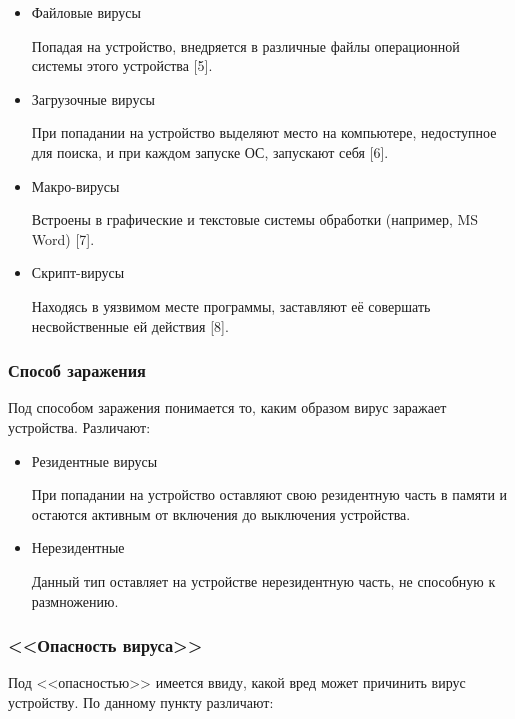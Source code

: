\documentclass[12pt]{article}
\begin{document}
\begin{itemize}
    \item Файловые вирусы 
        \begin{flushleft}
        Попадая на устройство, внедряется в различные файлы операционной системы этого устройства [5].
        \end{flushleft}
    \item Загрузочные вирусы
        \begin{flushleft}
        При попадании на устройство выделяют место на компьютере, недоступное для поиска, и при каждом запуске ОС, запускают себя [6].
        \end{flushleft}
    \item Макро-вирусы
        \begin{flushleft}
        Встроены в графические и текстовые системы обработки (например, MS Word) [7].
        \end{flushleft}
    \item Скрипт-вирусы
        \begin{flushleft}
        Находясь в уязвимом месте программы, заставляют её совершать несвойственные ей действия [8].
        \end{flushleft}
\end{itemize}

\subsubsection*{Способ заражения}
Под способом заражения понимается то, каким образом вирус заражает устройства. Различают:

\begin{itemize}
    \item Резидентные вирусы
    \begin{flushleft}
        При попадании на устройство оставляют свою резидентную часть в памяти и остаются активным от включения до выключения устройства.
    \end{flushleft}
    \item Нерезидентные
    \begin{flushleft}
        Данный тип оставляет на устройстве нерезидентную часть, не способную к размножению.
    \end{flushleft}
\end{itemize}

\subsubsection*{<<Опасность вируса>>}
Под <<опасностью>> имеется ввиду, какой вред может причинить вирус устройству. По данному пункту различают:
\end{document}
